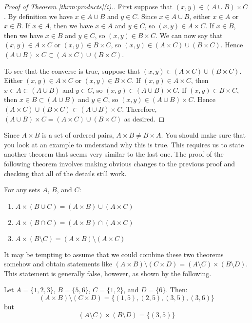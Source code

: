 \begin{proof}[Proof of Theorem \ref{thrm:products}(i).]
First suppose that $(x,y)\in (A\cup B)\times C$.  By definition we have
$x\in A\cup B$ and $y\in C$.  Since $x\in A\cup B$, either $x\in A$ or
$x\in B$.  If $x\in A$, then we have $x\in A$ and $y\in C$, so $(x,y)\in
A\times C$. If $x\in B$, then we have $x\in B$ and $y\in C$, so
$(x,y)\in B\times C$.  We can now say that $(x,y)\in A\times C$ or
$(x,y)\in B\times C$, so $(x,y)\in(A\times C)\cup(B\times C)$.  Hence
$(A\cup B)\times C\subset (A\times C)\cup(B\times C)$.

To see that the converse is true, suppose that $(x,y)\in (A\times
C)\cup(B\times C)$.  Either $(x,y)\in A\times C$ or $(x,y)\in B\times
C$.  If $(x,y)\in A\times C$, then $x\in A\subset (A\cup B)$ and $y\in
C$, so $(x,y)\in(A\cup B)\times C$. If $(x,y)\in B\times C$, then $x\in
B\subset (A\cup B)$ and $y\in C$, so $(x,y)\in(A\cup B)\times C$.  Hence
$(A\times C)\cup(B\times C) \subset (A\cup B)\times C$.  Therefore,
$(A\cup B)\times C=(A\times C)\cup(B\times C)$ as desired.
\end{proof}

Since $A\times B$ is a set of ordered pairs, $A\times B\neq B\times A$.
You should make sure that you look at an example to understand why this
is true.  This requires us to state another theorem that seems very
similar to the last one.  The proof of the following theorem involves
making obvious changes to the previous proof and checking that all of
the details still work.

\begin{thrm}
For any sets $A$, $B$, and $C$:
\begin{enumerate}
\item $A\times (B\cup C)=(A\times B)\cup(A\times C)$
\item $A\times (B\cap C)=(A\times B)\cap(A\times C)$
\item $A\times (B\setminus C)=(A\times B)\setminus(A\times C)$
\end{enumerate}
\end{thrm}

It may be tempting to assume that we could combine these two theorems
somehow and obtain statements like $(A\times B) \setminus (C\times D)=
(A\setminus C) \times (B\setminus D)$.  This statement is generally false,
however, as shown by the following.

\begin{example}
Let $A=\{ 1,2,3\}$, $B=\{5,6\}$, $C=\{1,2\}$, and $D=\{6\}$.  Then:
\[(A\times B)\setminus(C\times D)= \{(1,5), (2,5), (3,5), (3,6)\}\]
but
\[(A\setminus C)\times(B\setminus D)= \{(3,5)\}\]
\end{example}

